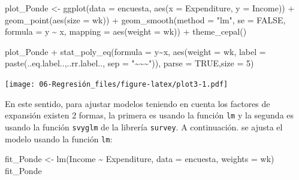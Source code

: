 \documentclass[
  12pt,
]{book}
\newenvironment{Shaded}{\begin{snugshade}}{\end{snugshade}}
\newcommand{\AttributeTok}[1]{\textcolor[rgb]{0.77,0.63,0.00}{#1}}
\newcommand{\ConstantTok}[1]{\textcolor[rgb]{0.00,0.00,0.00}{#1}}
\newcommand{\DecValTok}[1]{\textcolor[rgb]{0.00,0.00,0.81}{#1}}
\newcommand{\FunctionTok}[1]{\textcolor[rgb]{0.00,0.00,0.00}{#1}}
\newcommand{\NormalTok}[1]{#1}
\newcommand{\OtherTok}[1]{\textcolor[rgb]{0.56,0.35,0.01}{#1}}
\newcommand{\SpecialCharTok}[1]{\textcolor[rgb]{0.00,0.00,0.00}{#1}}
\newcommand{\StringTok}[1]{\textcolor[rgb]{0.31,0.60,0.02}{#1}}
\begin{document}
\begin{Shaded}
\begin{Highlighting}[]
\NormalTok{plot\_Ponde }\OtherTok{\textless{}{-}} \FunctionTok{ggplot}\NormalTok{(}\AttributeTok{data =}\NormalTok{ encuesta,}
                     \FunctionTok{aes}\NormalTok{(}\AttributeTok{x =}\NormalTok{ Expenditure, }\AttributeTok{y =}\NormalTok{ Income)) }\SpecialCharTok{+} 
                     \FunctionTok{geom\_point}\NormalTok{(}\FunctionTok{aes}\NormalTok{(}\AttributeTok{size =}\NormalTok{ wk)) }\SpecialCharTok{+}
                     \FunctionTok{geom\_smooth}\NormalTok{(}\AttributeTok{method =} \StringTok{"lm"}\NormalTok{, }\AttributeTok{se =} \ConstantTok{FALSE}\NormalTok{, }\AttributeTok{formula =}\NormalTok{ y }\SpecialCharTok{\textasciitilde{}}\NormalTok{ x,                      }\AttributeTok{mapping =} \FunctionTok{aes}\NormalTok{(}\AttributeTok{weight =}\NormalTok{ wk)) }\SpecialCharTok{+} \FunctionTok{theme\_cepal}\NormalTok{()}

\NormalTok{plot\_Ponde }\SpecialCharTok{+} \FunctionTok{stat\_poly\_eq}\NormalTok{(}\AttributeTok{formula =}\NormalTok{ y}\SpecialCharTok{\textasciitilde{}}\NormalTok{x, }\FunctionTok{aes}\NormalTok{(}\AttributeTok{weight =}\NormalTok{ wk, }
\AttributeTok{label =} \FunctionTok{paste}\NormalTok{(..eq.label..,..rr.label.., }\AttributeTok{sep =} \StringTok{"\textasciitilde{}\textasciitilde{}\textasciitilde{}"}\NormalTok{)), }\AttributeTok{parse =} \ConstantTok{TRUE}\NormalTok{,}\AttributeTok{size =} \DecValTok{5}\NormalTok{)}
\end{Highlighting}
\end{Shaded}

\texttt{[image: 06-Regresión\_files/figure-latex/plot3-1.pdf]}

En este sentido, para ajustar modelos teniendo en cuenta los factores de expansión existen 2 formas, la primera es usando la función \texttt{lm} y la segunda es usando la función \texttt{svyglm} de la librería \texttt{survey}. A continuación. se ajusta el modelo usando la función \texttt{lm}:

\begin{Shaded}
\begin{Highlighting}[]
\NormalTok{fit\_Ponde }\OtherTok{\textless{}{-}} \FunctionTok{lm}\NormalTok{(Income }\SpecialCharTok{\textasciitilde{}}\NormalTok{ Expenditure, }\AttributeTok{data =}\NormalTok{ encuesta, }\AttributeTok{weights =}\NormalTok{ wk)}
\NormalTok{fit\_Ponde}
\end{Highlighting}
\end{Shaded}
\end{document}
